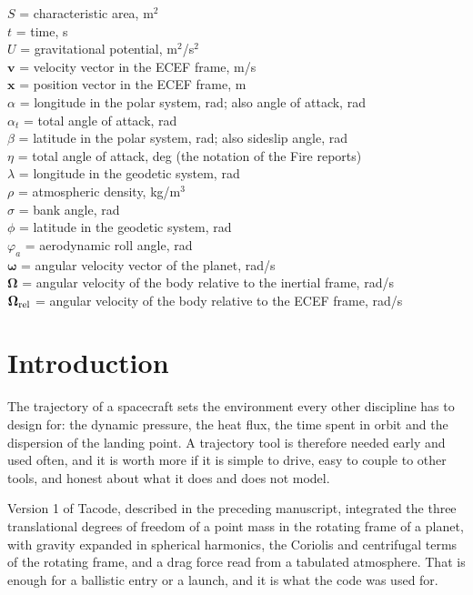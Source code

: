 \documentclass[11pt,a4paper]{article}
\newcommand{\bx}{{\boldsymbol x}}
\newcommand{\bv}{{\boldsymbol v}}
\newcommand{\bOm}{{\boldsymbol \Omega}}
\newcommand{\bom}{{\boldsymbol \omega}}
\begin{document}
\begin{tabbing}
	$S$        \> = \> characteristic area, m$^2$ \\
	$t$        \> = \> time, s \\
	$U$        \> = \> gravitational potential, m$^2$/s$^2$ \\
	$\bv$      \> = \> velocity vector in the ECEF frame, m/s \\
	$\bx$      \> = \> position vector in the ECEF frame, m \\
	$\alpha$   \> = \> longitude in the polar system, rad; also angle of attack, rad \\
	$\alpha_t$ \> = \> total angle of attack, rad \\
	$\beta$    \> = \> latitude in the polar system, rad; also sideslip angle, rad \\
	$\eta$     \> = \> total angle of attack, deg (the notation of the Fire reports) \\
	$\lambda$  \> = \> longitude in the geodetic system, rad \\
	$\rho$     \> = \> atmospheric density, kg/m$^3$ \\
	$\sigma$   \> = \> bank angle, rad \\
	$\phi$     \> = \> latitude in the geodetic system, rad \\
	$\varphi_a$ \> = \> aerodynamic roll angle, rad \\
	$\bom$     \> = \> angular velocity vector of the planet, rad/s \\
	$\bOm$     \> = \> angular velocity of the body relative to the inertial frame, rad/s \\
	$\bOm_{\rm rel}$ \> = \> angular velocity of the body relative to the ECEF frame, rad/s \\
\end{tabbing}

\section{Introduction}

The trajectory of a spacecraft sets the environment every other discipline has to design
for: the dynamic pressure, the heat flux, the time spent in orbit and the dispersion of
the landing point. A trajectory tool is therefore needed early and used often, and it is
worth more if it is simple to drive, easy to couple to other tools, and honest about what
it does and does not model.

Version 1 of Tacode, described in the preceding manuscript, integrated the three
translational degrees of freedom of a point mass in the rotating frame of a planet, with
gravity expanded in spherical harmonics, the Coriolis and centrifugal terms of the
rotating frame, and a drag force read from a tabulated atmosphere. That is enough for a
ballistic entry or a launch, and it is what the code was used for.
\end{document}
